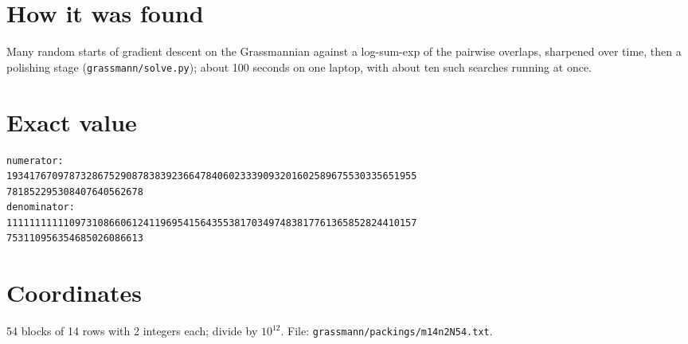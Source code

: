 \documentclass[11pt,a4paper]{article}
\begin{document}
\section{How it was found}
Many random starts of gradient descent on the Grassmannian against a log-sum-exp of the pairwise overlaps, sharpened over time, then a polishing stage (\texttt{grassmann/solve.py}); about 100 seconds on one laptop, with about ten such searches running at once.


\appendix
\section{Exact value}
{\small
\begin{verbatim}
numerator:
193417670978732867529087838392366478406023339093201602589675530335651955
781852295308407640562678
denominator:
111111111110973108660612411969541564355381703497483817761365852824410157
753110956354685026086613
\end{verbatim}}

\section{Coordinates}
54 blocks of 14 rows with 2 integers each; divide by $10^{12}$. File: \texttt{grassmann/packings/m14n2N54.txt}.
{\tiny
\begin{multicols}{4}
\end{multicols}}
\end{document}
